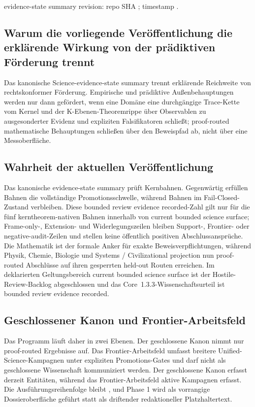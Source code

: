 evidence-state summary revision: repo SHA ; timestamp .

\subsection{Warum die vorliegende Veröffentlichung die erklärende Wirkung von der prädiktiven Förderung trennt}
Das kanonische Science-evidence-state summary trennt erklärende Reichweite von rechtskonformer Förderung. Empirische und prädiktive Außenbehauptungen werden nur dann gefördert, wenn eine Domäne eine durchgängige Trace-Kette vom Kernel und der K-Ebenen-Theoremrippe über Observablen zu ausgesonderter Evidenz und expliziten Falsifikatoren schließt; proof-routed mathematische Behauptungen schließen über den Beweispfad ab, nicht über eine Messoberfläche.

\subsection{Wahrheit der aktuellen Veröffentlichung}
Das kanonische evidence-state summary prüft  Kernbahnen. Gegenwärtig erfüllen  Bahnen die vollständige Promotionsschwelle, während  Bahnen im Fail-Closed-Zustand verbleiben.
Diese bounded review evidence recorded-Zahl gilt nur für die fünf kerntheorem-nativen Bahnen innerhalb von current bounded science surface; Frame-only-, Extension- und Widerlegungszeilen bleiben Support-, Frontier- oder negative-audit-Zeilen und stellen keine öffentlich positiven Abschlussansprüche.
Die Mathematik ist der formale Anker für exakte Beweisverpflichtungen, während Physik, Chemie, Biologie und Systems / Civilizational projection nun proof-routed Abschlüsse auf ihren gesperrten held-out Routen erreichen. Im deklarierten Geltungsbereich current bounded science surface ist der Hostile-Review-Backlog abgeschlossen und das Core~1.3.3-Wissenschaftsurteil ist bounded review evidence recorded.

\subsection{Geschlossener Kanon und Frontier-Arbeitsfeld}
Das Programm läuft daher in zwei Ebenen. Der geschlossene Kanon nimmt nur proof-routed Ergebnisse auf. Das Frontier-Arbeitsfeld umfasst breitere Unified-Science-Kampagnen unter expliziten Promotions-Gates und darf nicht als geschlossene Wissenschaft kommuniziert werden.
Der geschlossene Kanon erfasst derzeit  Entitäten, während das Frontier-Arbeitsfeld  aktive Kampagnen erfasst.
Die Ausführungsreihenfolge bleibt , und Phase 1 wird als vorrangige Dossieroberfläche geführt statt als driftender redaktioneller Platzhaltertext.

